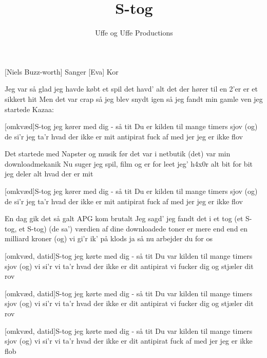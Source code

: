 \documentclass[a4paper,11pt]{article}
\title{S-tog}
\author{Uffe og Uffe Productions}
\begin{document}
\maketitle

\begin{roles}
[Niels Buzz-worth] Sanger
[Eva] Kor
\end{roles}

\begin{props}
\prop{}
\end{props}
  
\begin{song}

Jeg var så glad jeg havde købt et spil
det havd' alt det der hører til
en 2'er er et sikkert hit
Men det var crap så jeg blev snydt igen
så jeg fandt min gamle ven
jeg startede Kazaa:

[omkvæd]S-tog jeg kører med dig - så tit
Du er kilden til mange timers sjov
(og) de si'r jeg ta'r hvad der ikke er mit
antipirat fuck af med jer jeg er ikke flov


Det startede med Napster og musik
før det var i netbutik
(det) var min downloadmekanik
Nu suger jeg spil, film og er for leet
jeg' h4x0r alt bit for bit
jeg deler alt hvad der er mit


[omkvæd]S-tog jeg kører med dig - så tit
Du er kilden til mange timers sjov
(og) de si'r jeg ta'r hvad der ikke er mit
antipirat fuck af med jer jeg er ikke flov


En dag gik det så galt
APG kom brutalt
Jeg sagd' jeg fandt det i et tog
(et S-tog, et S-tog)
(de sa') værdien af dine downloadede toner
er mere end end en milliard kroner
(og) vi gi'r ik' på klods
ja så nu arbejder du for os

[omkvæd, datid]S-tog jeg kørte med dig - så tit
Du var kilden til mange timers sjov
(og) vi si'r vi ta'r hvad der ikke er dit
antipirat vi fucker dig og stjæler dit rov


[omkvæd, datid]S-tog jeg kørte med dig - så tit
Du var kilden til mange timers sjov
(og) vi si'r vi ta'r hvad der ikke er dit
antipirat vi fucker dig og stjæler dit rov

[omkvæd, datid]S-tog jeg kørte med dig - så tit
Du var kilden til mange timers sjov
(og) vi si'r vi ta'r hvad der ikke er dit
antipirat fuck af med jer jeg er ikke flob


\end{song}
\end{document}
